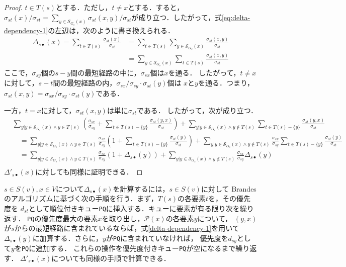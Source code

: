 \begin{proof}
  $t\in T(s)$とする．ただし，$t\neq x$とする．すると，$\sigma_{st}(x)/\sigma_{st}=\sum_{y\in\mathcal{S}_{G_s}(x)}\sigma_{st}(x,y)/\sigma_{st}$が成り立つ．したがって，式\ref{eq:delta-dependency-1}の左辺は，次のように書き換えられる．
  \begin{equation*}
    \begin{aligned}
      \Delta_{s\bullet}(x)=\sum_{t\in T(s)}\frac{\sigma_{st}(x)}{\sigma_{st}}
      &=\sum_{t\in T(s)}\sum_{y\in\mathcal{S}_{G_s}(x)}\frac{\sigma_{st}(x,y)}{\sigma_{st}}\\
      &=\sum_{y\in\mathcal{S}_{G_s}(x)}\sum_{t\in T(s)}\frac{\sigma_{st}(x,y)}{\sigma_{st}}
    \end{aligned}
  \end{equation*}
  ここで，$\sigma_{sy}$個の$s-y$間の最短経路の中に，$\sigma_{sx}$個は$x$を通る．
  したがって，$t\neq x$に対して，$s-t$間の最短経路の内，$\sigma_{sx}/\sigma_{sy}\cdot\sigma_{st}(y)$個は
  $x$と$y$を通る．つまり，$\sigma_{st}(x,y)=\sigma_{sx}/\sigma_{sy}\cdot\sigma_{st}(y)$である．

  一方，$t=x$に対して，$\sigma_{st}(x,y)$は単に$\sigma_{st}$である．
  したがって，次が成り立つ．
  \begin{equation*}
    \begin{aligned}
      &\sum_{y|y\in\mathcal{S}_{G_s}(x)\land y\in T(s)}\left(\frac{\sigma_{sx}}{\sigma_{sy}}+\sum_{t\in T(s)-\{y\}}\frac{\sigma_{st}(y,x)}{\sigma_{st}}\right)
      +\sum_{y|y\in\mathcal{S}_{G_s}(x)\land y\notin T(s)}\sum_{t\in T(s)-\{y\}}\frac{\sigma_{st}(y,x)}{\sigma_{st}} \\
      &\quad=\sum_{y|y\in\mathcal{S}_{G_s}(x)\land y\in T(s)}\frac{\sigma_{sx}}{\sigma_{sy}}\left(1+\sum_{t\in T(s)-\{y\}}\frac{\sigma_{st}(y)}{\sigma_{st}}\right)
      +\sum_{y|y\in\mathcal{S}_{G_s}(x)\land y\notin T(s)}\frac{\sigma_{sx}}{\sigma_{sy}}\sum_{t\in T(s)-\{y\}}\frac{\sigma_{st}(y)}{\sigma_{st}} \\
      &\quad=\sum_{y|y\in\mathcal{S}_{G_s}(x)\land y\in T(s)}\frac{\sigma_{sx}}{\sigma_{sy}}\left(1+\Delta_{s\bullet}(y)\right)
      +\sum_{y|y\in\mathcal{S}_{G_s}(x)\land y\notin T(s)}\frac{\sigma_{sx}}{\sigma_{sy}}\Delta_{s\bullet}(y) \\
    \end{aligned}
  \end{equation*}
  $\Delta'_{s\bullet}(x)$に対しても同様に証明できる．
\end{proof}

$s\in S(v),x\in V$について$\Delta_{s\bullet}(x)$を計算するには，$s\in S(v)$に対して
Brandesのアルゴリズムに基づく次の手順を行う．まず，$T(s)$の各要素$t$を，その優先度を
$d_{st}$として順位付きキュー\texttt{PQ}に挿入する．キューに要素が有る限り次を繰り返す．
\texttt{PQ}の優先度最大の要素$x$を取り出し，$\mathcal{P}(x)$の各要素$y$について，
$(y,x)$が$s$からの最短経路に含まれているならば，式\eqref{delta-dependency-1}を用いて
$\Delta_{s\bullet}(y)$に加算する．さらに，$y$が\texttt{PQ}に含まれていなければ，
優先度を$d_{sy}$として$y$を\texttt{PQ}に追加する．
これらの操作を優先度付きキュー\texttt{PQ}が空になるまで繰り返す．
$\Delta'_{s\bullet}(x)$についても同様の手順で計算できる．

